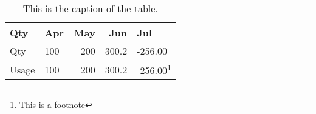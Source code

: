 \documentclass{article}
\begin{document}
\begin{table}[htbp]
\begin{tabular}{l l r r p{3.5cm}}
\toprule
Qty &Apr &May &Jun &Jul \\
\midrule
Qty &100 &200 &300.2 &-256.00 \\
Usage &100 &200 &300.2 &-256.00\footnote{This is a footnote} \\
\bottomrule
\end{tabular}
\caption{This is the caption of the table.}
\end{table}
\end{document}
